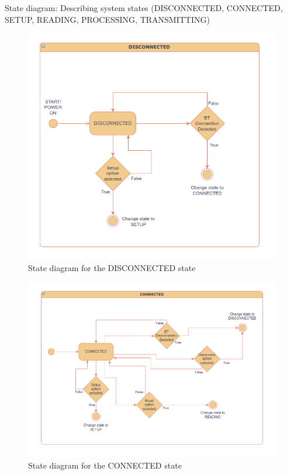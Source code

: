 State diagram: Describing system states (DISCONNECTED, CONNECTED, SETUP, READING, PROCESSING, TRANSMITTING)
\begin{figure}[H]
	\centering
	\includegraphics[scale=0.7]{diagrams/states_disconnected}
	\caption{State diagram for the DISCONNECTED state}
	\label{fig:states_disconnected}
\end{figure}

\begin{figure}[H]
	\centering
	\includegraphics[scale=0.8]{diagrams/states_connected}
	\caption{State diagram for the CONNECTED state}
	\label{fig:states_connected}
\end{figure}


